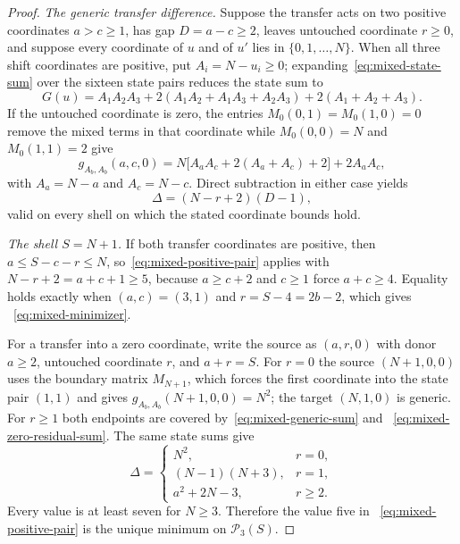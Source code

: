 \documentclass[pdflatex,sn-mathphys-num]{sn-jnl}
\theoremstyle{thmstyleone}
\theoremstyle{thmstylethree}
\theoremstyle{thmstyletwo}
\begin{document}
\begin{proof}
\emph{The generic transfer difference.}  Suppose the transfer acts on two
positive coordinates $a>c\ge1$, has gap $D=a-c\ge2$, leaves untouched
coordinate $r\ge0$, and suppose every coordinate of $u$ and of $u'$ lies in
$\{0,1,\ldots,N\}$.  When all three shift coordinates are positive, put
$A_i=N-u_i\ge0$; expanding~\eqref{eq:mixed-state-sum} over the sixteen state
pairs reduces the state sum to
\begin{equation}
 G(u)=A_1A_2A_3
 +2(A_1A_2+A_1A_3+A_2A_3)
 +2(A_1+A_2+A_3).                                    \label{eq:mixed-generic-sum}
\end{equation}
If the untouched coordinate is zero, the entries $M_0(0,1)=M_0(1,0)=0$
remove the mixed terms in that coordinate while $M_0(0,0)=N$ and
$M_0(1,1)=2$ give
\begin{equation}
 g_{A_b,A_b}(a,c,0)
 =N\bigl[A_aA_c+2(A_a+A_c)+2\bigr]+2A_aA_c,          \label{eq:mixed-zero-residual-sum}
\end{equation}
with $A_a=N-a$ and $A_c=N-c$.  Direct subtraction in either case yields
\begin{equation}
 \Delta=(N-r+2)(D-1),                                \label{eq:mixed-positive-pair}
\end{equation}
valid on every shell on which the stated coordinate bounds hold.

\emph{The shell $S=N+1$.}  If both transfer coordinates are positive, then
$a\le S-c-r\le N$, so~\eqref{eq:mixed-positive-pair} applies with
$N-r+2=a+c+1\ge5$, because $a\ge c+2$ and $c\ge1$ force $a+c\ge4$.
Equality holds exactly when $(a,c)=(3,1)$ and $r=S-4=2b-2$, which gives
~\eqref{eq:mixed-minimizer}.

For a transfer into a zero coordinate, write the source as $(a,r,0)$ with
donor $a\ge2$, untouched coordinate $r$, and $a+r=S$.  For $r=0$ the source
$(N+1,0,0)$ uses the boundary matrix $M_{N+1}$, which forces the first
coordinate into the state pair $(1,1)$ and gives
$g_{A_b,A_b}(N+1,0,0)=N^2$; the target $(N,1,0)$ is generic.  For $r\ge1$
both endpoints are covered by~\eqref{eq:mixed-generic-sum} and
~\eqref{eq:mixed-zero-residual-sum}.  The same state sums give
\begin{equation}
 \Delta=
 \begin{cases}
  N^2,&r=0,\\
  (N-1)(N+3),&r=1,\\
  a^2+2N-3,&r\ge2.
 \end{cases}                                         \label{eq:mixed-zero-recipient}
\end{equation}
Every value is at least seven for $N\ge3$.  Therefore the value five in
~\eqref{eq:mixed-positive-pair} is the unique minimum on $\mathcal P_3(S)$.


\end{proof}
\end{document}
